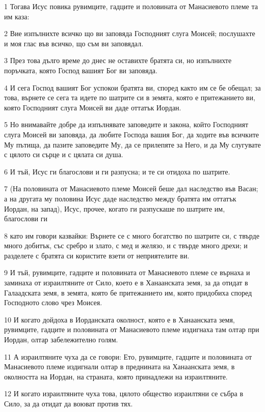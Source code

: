 \par 1 Тогава Исус повика рувимците, гадците и половината от Манасиевото племе та им каза:
\par 2 Вие изпълнихте всичко що ви заповяда Господният слуга Моисей; послушахте и моя глас във всичко, що съм ви заповядал.
\par 3 През това дълго време до днес не оставихте братята си, но изпълнихте поръчката, която Господ вашият Бог ви заповяда.
\par 4 И сега Господ вашият Бог успокои братята ви, според както им се бе обещал; за това, върнете се сега та идете по шатрите си в земята, която е притежанието ви, която Господният слуга Моисей ви даде оттатък Иордан.
\par 5 Но внимавайте добре да изпълнявате заповедите и закона, който Господният слуга Моисей ви заповяда, да любите Господа вашия Бог, да ходите във всичките Му пътища, да пазите заповедите Му, да се прилепяте за Него, и да Му слугувате с цялото си сърце и с цялата си душа.
\par 6 И тъй, Исус ги благослови и ги разпусна; и те си отидоха по шатрите.
\par 7 (На половината от Манасиевото племе Моисей беше дал наследство във Васан; а на другата му половина Исус даде наследство между братята им оттатък Иордан, на запад), Исус, прочее, когато ги разпускаше по шатрите им, благослови ги
\par 8 като им говори казвайки: Върнете се с много богатство по шатрите си, с твърде много добитък, със сребро и злато, с мед и желязо, и с твърде много дрехи; и разделете с братята си користите взети от неприятелите ви.
\par 9 И тъй, рувимците, гадците и половината от Манасиевото племе се върнаха и заминаха от израилтяните от Сило, което е в Ханаанската земя, за да отидат в Галаадската земя, в земята, която бе притежанието им, която придобиха според Господното слово чрез Моисея.
\par 10 И когато дойдоха в Иорданската околност, която е в Ханаанската земя, рувимците, гадците и половината от Манасиевото племе издигнаха там олтар при Иордан, олтар забележително голям.
\par 11 А израилтяните чуха да се говори: Ето, рувимците, гадците и половината от Манасиевото племе издигнали олтар в преднината на Ханаанската земя, в околността на Иордан, на страната, която принадлежи на израилтяните.
\par 12 И когато израилтяните чуха това, цялото общество израилтяни се събра в Сило, за да отидат да воюват против тях.
